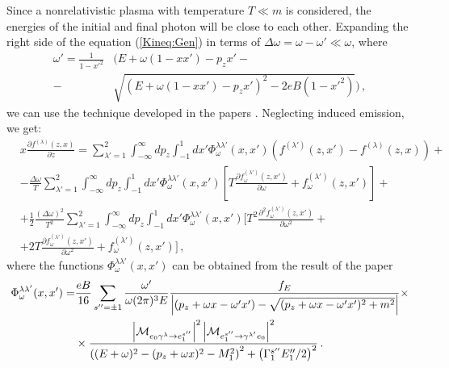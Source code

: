 \documentclass[
aps,%
12pt,%
final,%
notitlepage,%
oneside,%
onecolumn,%
nobibnotes,%
nofootinbib,%
superscriptaddress,%
noshowpacs,%
centertags]%
{revtex4}
\begin{document}
Since a nonrelativistic plasma with temperature $T\ll m$ is considered, the energies of the initial and final photon will be close to each other.
Expanding the right side of the equation (\ref{Kineq:Gen}) in terms of $\Delta\omega=\omega-\omega'\ll\omega$, where
\begin{equation}
\begin{aligned}
\omega' = \frac{1}{1-x'^2}&\bigg(E+\omega(1-x x')-p_z x'-
\\		
-& \sqrt{(E+\omega(1-x x')-p_zx')^2 - 2eB (1-x'^2)}\bigg)\, ,
\end{aligned}
\end{equation}
we can use the technique developed in the papers \cite{Komp,Lubarsk}. Neglecting induced emission, we get:
\begin{equation}\label{eq:KinSerDeltaw}
\begin{aligned}
&x\frac{\partial f^{(\lambda)}(z,x)}{\partial z} =  \sum_{\lambda'=1}^{2} \int_{-\infty}^{\infty}dp_z\int_{-1}^{1}dx'\Phi_\omega^{\lambda\lambda'}(x,x') (f^{(\lambda')}(z,x')-f^{(\lambda)}(z,x)) +
\\
&- \frac{\Delta \omega}{T} \sum_{\lambda'=1}^{2} \int_{-\infty}^{\infty}dp_z\int_{-1}^{1}dx'\Phi_\omega^{\lambda\lambda'}(x,x') 
\left[
T \frac{\partial f_\omega^{(\lambda')}(z,x')}{\partial \omega} + f_\omega^{(\lambda')}(z,x')
\right]+
\\
&+ \frac{1}{2}\frac{(\Delta \omega)^2}{T^2} \sum_{\lambda'=1}^{2} \int_{-\infty}^{\infty}dp_z\int_{-1}^{1}dx'\Phi_\omega^{\lambda\lambda'}(x,x') 
\bigg[
T^2 \frac{\partial^2 f_\omega^{(\lambda')}(z,x')}{\partial \omega^2}+
\\		
&+ 2T \frac{\partial f_\omega^{(\lambda')}(z,x')}{\partial \omega^2}+f_\omega^{(\lambda')}(z,x')
\bigg] 
\,  ,
\end{aligned}
\end{equation}
where the functions $\Phi_\omega^{\lambda\lambda'}(x,x')$ can be obtained from the result of the paper \cite{YarkovJoPCS:2020}
\begin{equation}
\begin{aligned}
	\Phi^{\lambda\lambda'}_\omega(x,x')=&\frac{eB}{16}\sum_{s^{\prime\prime}=\pm 1}^{}\frac{\omega'}{\omega (2\pi)^3 E}\frac{f_E}{\left|(p_z+\omega x - \omega' x')-\sqrt{(p_z+\omega x - \omega' x')^2+m^2}\right|}\times
	\\
	&\times\frac{\left|{\cal M}_{e_0\gamma^\lambda\to e^{s^{\prime\prime}}_1}\right|^2\left|{\cal
	M}_{e^{s^{\prime\prime}}_1
	\to\gamma^{\lambda'}e_0}\right|^2}{\left((E+\omega)^2-(p_z+\omega x)^2 -M_1^2\right)^2+
	\left(\Gamma^{s^{\prime\prime}}_1
	E_1^{\prime\prime}/2\right)^2}\, .
	\end{aligned}
\end{equation}
\end{document}
